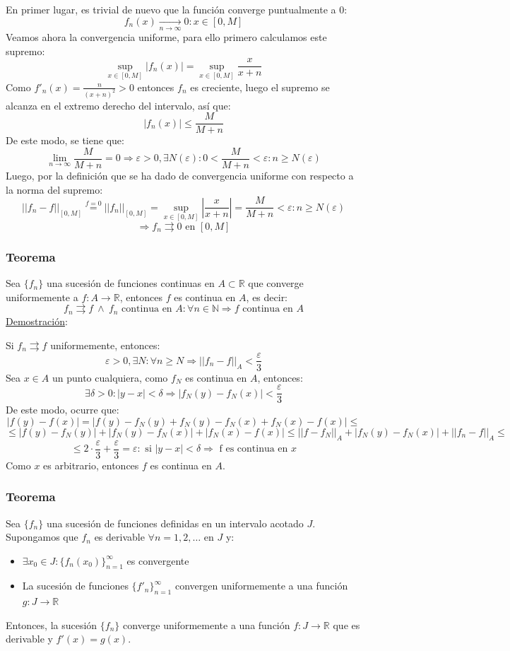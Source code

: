 \documentclass[10pt,a4paper,openright]{book}
\begin{document}
En primer lugar, es trivial de nuevo que la función converge puntualmente a 0:
$$f_n (x)\underset{n \to \infty}{\longrightarrow} 0 : x \in [0,M]$$
Veamos ahora la convergencia uniforme, para ello primero calculamos este supremo:
$$\underset{x \in [0,M]}{\sup} |f_n(x)| = \underset{x \in [0,M]}{\sup} \frac{x}{x+n}$$
Como $f'_n (x) = \frac{n}{(x+n)^2} > 0$ entonces $f_n $ es creciente, luego el supremo se alcanza en el extremo derecho del intervalo, así que:
$$|f_n (x)| \leq \frac{M}{M + n}$$
De este modo, se tiene que:
$$\lim_{n \to \infty} \frac{M}{M + n} = 0 \Rightarrow \varepsilon > 0, \exists N (\varepsilon) : 0 < \frac{M}{M + n} < \varepsilon: n \geq N(\varepsilon)$$
Luego, por la definición que se ha dado de convergencia uniforme con respecto a la norma del supremo:
$$||f_n - f||_{[0,M]} \stackrel{f=0}{=} ||f_n||_{[0,M]} = \underset{x \in [0,M]}{\sup} \left| \frac{x}{x+n} \right|= \frac{M}{M+n} < \varepsilon : n \geq N(\varepsilon)$$
$$\Rightarrow f_n \rightrightarrows 0 \mbox{ en } [0,M]$$

\subsubsection*{Teorema}
Sea $\{f_n\}$ una sucesión de funciones continuas en $A \subset \mathbb{R}$ que converge uniformemente a $f: A \to \mathbb{R}$, entonces $f$ es continua en $A$, es decir:
$$f_n\rightrightarrows f \ \wedge \ f_n \mbox{ continua  en }A: \forall n\in \mathbb N\Rightarrow f \mbox{ continua en }A$$
\underline{Demostración}:

Si $f_n \rightrightarrows f$ uniformemente, entonces:
$$\varepsilon > 0, \exists N: \forall n \geq N \Rightarrow ||f_n - f ||_A < \frac{\varepsilon}{3}$$
Sea $x \in A$ un punto cualquiera, como $f_N$ es continua en  $A$, entonces:
$$\exists \delta > 0 : |y-x|<\delta \Rightarrow |f_N (y) - f_N (x)| < \frac{\varepsilon}{3}$$
De este modo, ocurre que:
$$|f (y) - f (x)| = |f (y) - f_N (y) + f_N (y) -f_N (x) + f_N (x) - f(x)| \leq $$
$$\leq |f(y) - f_N (y)| + |f_N (y) - f_N (x)| + |f_N (x) - f(x)| \leq || f - f_N ||_A + |f_N (y) - f_N (x)| + ||f_n - f||_A \leq$$
$$\leq 2 \cdot \frac{\varepsilon}{3} + \frac{\varepsilon}{3}  = \varepsilon : \mbox{ si } |y-x| < \delta \Rightarrow \mbox{ f es continua en } x$$
Como $x$ es arbitrario, entonces $f$ es continua en $A$.

\subsubsection*{Teorema}
Sea $\{f_n\}$ una sucesión de funciones definidas en un intervalo acotado $J$. Supongamos que $f_n$ es derivable $\forall n = 1,2, \ldots$ en $J$ y:
\begin{itemize}
\item $\exists x_0 \in J : \{f_n (x_0)\}_{n = 1}^\infty$ es convergente

\item La sucesión de funciones $\{f'_n \}_{n = 1}^\infty$ convergen uniformemente a una función $g : J \to \mathbb{R}$
\end{itemize}
Entonces, la sucesión $\{f_n\}$ converge uniformemente a una función $f: J \to \mathbb{R}$ que es derivable y $f'(x) = g(x)$.
\end{document}
